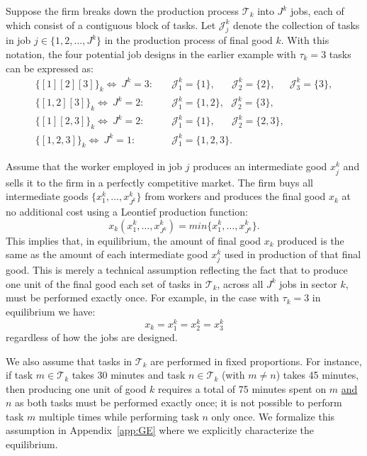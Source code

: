 \documentclass{article}
\theoremstyle{plain}
\theoremstyle{plain}
\begin{document}
Suppose the firm breaks down the production process $\mathcal{T}_k$ into $J^k$ jobs, each of which consist of a contiguous block of tasks.
Let $\mathcal{J}_j^k$ denote the collection of tasks in job $j \in \{1, 2, \ldots, J^k\}$ in the production process of final good $k$.
With this notation, the four potential job designs in the earlier example with $\tau_k=3$ tasks can be expressed as:
\begin{align*}
\{[1][2][3]\}_k \Longleftrightarrow \ J^k = 3:  & \quad \mathcal{J}^k_1 = \{1\}, \quad \ \ \ \mathcal{J}^k_2 = \{2\}, \quad \ \ \mathcal{J}^k_3 = \{3\}, \\
\{[1,2][3]\}_k \Longleftrightarrow \ J^k = 2: & \quad \mathcal{J}^k_1 = \{1, 2\}, \ \ \ \mathcal{J}^k_2 = \{3\}, \\
\{[1][2,3]\}_k \Longleftrightarrow \ J^k = 2: & \quad \mathcal{J}^k_1 = \{1\}, \quad \ \ \ \mathcal{J}^k_2 = \{2, 3\}, \\
\{[1,2,3]\}_k \Longleftrightarrow \ J^k = 1: & \quad \mathcal{J}^k_1 = \{1,2,3\}.
\end{align*}

Assume that the worker employed in job $j$ produces an intermediate good $x_j^k$ and sells it to the firm in a perfectly competitive market.
The firm buys all intermediate goods $\{x_1^k, \ldots, x_{J^k}^k\}$ from workers and produces the final good $x_k$ at no additional cost using a Leontief production function:
\[
x_k(x_1^k, \ldots, x_{J^k}^k) = min\{x_1^k, \ldots, x_{J^k}^k\}.
\]
This implies that, in equilibrium, the amount of final good $x_k$ produced is the same as the amount of each intermediate good $x_j^k$ used in production of that final good.
This is merely a technical assumption reflecting the fact that to produce one unit of the final good each set of tasks in $\mathcal{T}_k$, across all $J^k$ jobs in sector $k$, must be performed exactly once.
For example, in the case with $\tau_k=3$ in equilibrium we have:
\[
x_k = x_1^k = x_2^k = x_3^k
\]
regardless of how the jobs are designed.

We also assume that tasks in $\mathcal{T}_k\!$ are performed in fixed proportions.
For instance, if task $m \in \mathcal{T}_k$ takes 30 minutes and task $n \in \mathcal{T}_k$ (with $m \neq n$) takes 45 minutes, then producing one unit of good $k$ requires a total of 75 minutes spent on $m$ \underline{and} $n$ as both tasks must be performed exactly once; it is not possible to perform task $m$ multiple times while performing task $n$ only once.
We formalize this assumption in Appendix~\ref{app:GE} where we explicitly characterize the equilibrium.
\end{document}
